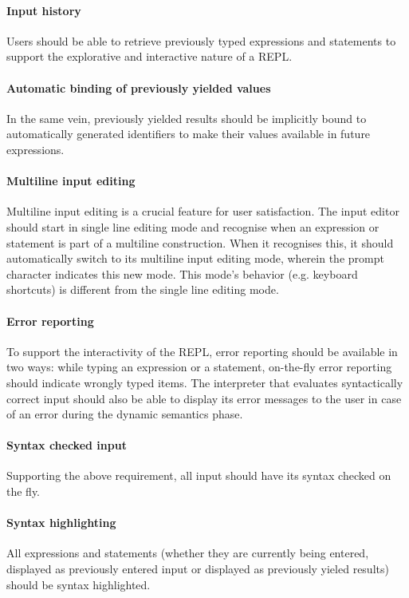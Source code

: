 \paragraph{Input history} Users should be able to retrieve previously
typed expressions and statements to support the explorative and interactive
nature of a REPL.

\paragraph{Automatic binding of previously yielded values} In the same vein,
previously yielded results should be implicitly bound to automatically generated
identifiers to make their values available in future expressions.

\paragraph{Multiline input editing} Multiline input editing is a crucial feature
for user satisfaction. The input editor should start in single line editing mode
and recognise when an expression or statement is part of a multiline
construction. When it recognises this, it should automatically switch to its
multiline input editing mode, wherein the prompt character indicates this new
mode. This mode's behavior (e.g. keyboard shortcuts) is different from the
single line editing mode.

\paragraph{Error reporting} To support the interactivity of the REPL, error
reporting should be available in two ways: while typing an expression or a
statement, on-the-fly error reporting should indicate wrongly typed items. The
interpreter that evaluates syntactically correct input should also be able to
display its error messages to the user in case of an error during the dynamic
semantics phase.

\paragraph{Syntax checked input} Supporting the above requirement, all
input should have its syntax checked on the fly.

\paragraph{Syntax highlighting} All expressions and statements (whether they are
currently being entered, displayed as previously entered input or displayed as
previously yieled results) should be syntax highlighted.

